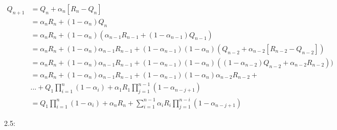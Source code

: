 \documentclass[11pt]{article}
\begin{document}
\begin{align} 
Q_{n+1} & = Q_n + \alpha_n [R_n - Q_n] \\
& = \alpha_n R_n + (1 - \alpha_n) Q_n \\
& = \alpha_n R_n + (1 - \alpha_n) (\alpha_{n-1}R_{n-1} + (1 - \alpha_{n-1})Q_{n-1})  \\
& = \alpha_n R_n + (1 - \alpha_n)\alpha_{n-1} R_{n-1} + (1 - \alpha_{n-1})(1 - \alpha_n)(Q_{n-2} + \alpha_{n-2}[R_{n-2} - Q_{n-2}]) \\
& = \alpha_n R_n + (1 - \alpha_n)\alpha_{n-1} R_{n-1} + (1 - \alpha_{n-1})(1 - \alpha_n)((1 - \alpha_{n-2})Q_{n-2} + \alpha_{n-2}R_{n-2})) \\
& = \alpha_n R_n + (1 - \alpha_n)\alpha_{n-1} R_{n-1} + (1 - \alpha_{n-1})(1 - \alpha_n)\alpha_{n-2}R_{n-2} +  \\ 
& ...  +  Q_1 \prod_{i=1}^n(1 - \alpha_i) + \alpha_{1} R_1 \prod_{j = 1}^{n - 1} (1 - \alpha_{n - j + 1}) \\
& = Q_1 \prod_{i=1}^n(1 - \alpha_i) + \alpha_n R_n + \sum^{n - 1}_{i = 1}\alpha_{i} R_i \prod_{j = 1}^{n - i} (1 - \alpha_{n - j + 1})
\end{align}

2.5:
\end{document}
